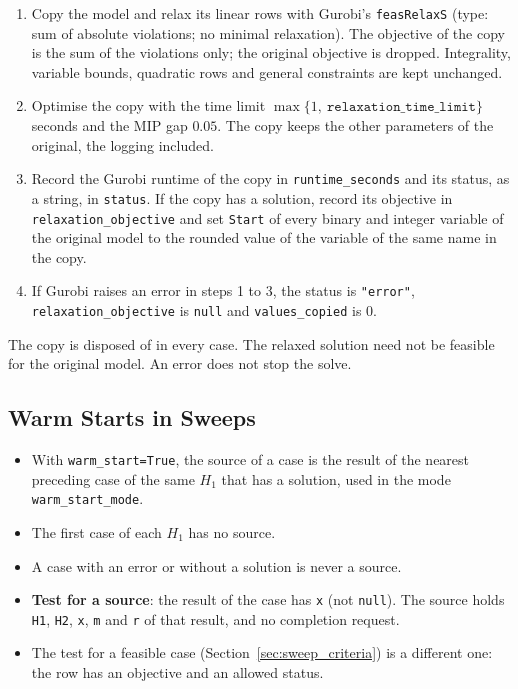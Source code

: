 \begin{enumerate}[nosep,label=\arabic*.]
  \item Copy the model and relax its linear rows with Gurobi's \texttt{feasRelaxS} (type: sum of absolute violations; no minimal relaxation). The objective of the copy is the sum of the violations only; the original objective is dropped. Integrality, variable bounds, quadratic rows and general constraints are kept unchanged.
  \item Optimise the copy with the time limit $\max\{1,\ \texttt{relaxation\_time\_limit}\}$ seconds and the MIP gap $0.05$. The copy keeps the other parameters of the original, the logging included.
  \item Record the Gurobi runtime of the copy in \texttt{runtime\_seconds} and its status, as a string, in \texttt{status}. If the copy has a solution, record its objective in \texttt{relaxation\_objective} and set \texttt{Start} of every binary and integer variable of the original model to the rounded value of the variable of the same name in the copy.
  \item If Gurobi raises an error in steps 1 to 3, the status is \texttt{"error"}, \texttt{relaxation\_objective} is \texttt{null} and \texttt{values\_copied} is $0$.
\end{enumerate}
The copy is disposed of in every case. The relaxed solution need not be feasible for the original model. An error does not stop the solve.

\subsection{Warm Starts in Sweeps}
\label{sec:warm_sweeps}

\begin{itemize}[nosep,leftmargin=1.5em]
  \item With \texttt{warm\_start=True}, the source of a case is the result of the nearest preceding case of the same $H_1$ that has a solution, used in the mode \texttt{warm\_start\_mode}.
  \item The first case of each $H_1$ has no source.
  \item A case with an error or without a solution is never a source.
  \item \textbf{Test for a source}: the result of the case has \texttt{x} (not \texttt{null}). The source holds \texttt{H1}, \texttt{H2}, \texttt{x}, \texttt{m} and \texttt{r} of that result, and no completion request.
  \item The test for a feasible case (Section~\ref{sec:sweep_criteria}) is a different one: the row has an objective and an allowed status.
\end{itemize}

